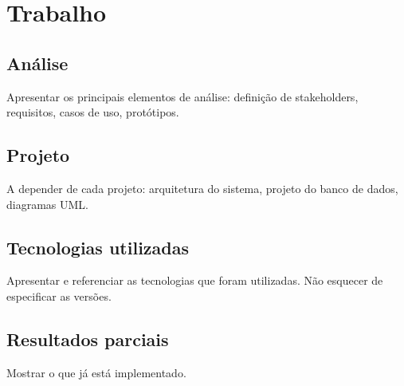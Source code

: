 \chapter{Trabalho}\label{chap:trabalho}

\section{Análise}

Apresentar os principais elementos de análise: definição de stakeholders, requisitos, casos de uso, protótipos. 


\section{Projeto}

A depender de cada projeto: arquitetura do sistema, projeto do banco de dados, diagramas UML.

\section{Tecnologias utilizadas}

Apresentar e referenciar as tecnologias que foram utilizadas. Não esquecer de especificar as versões.

\section{Resultados parciais}

Mostrar o que já está implementado.
